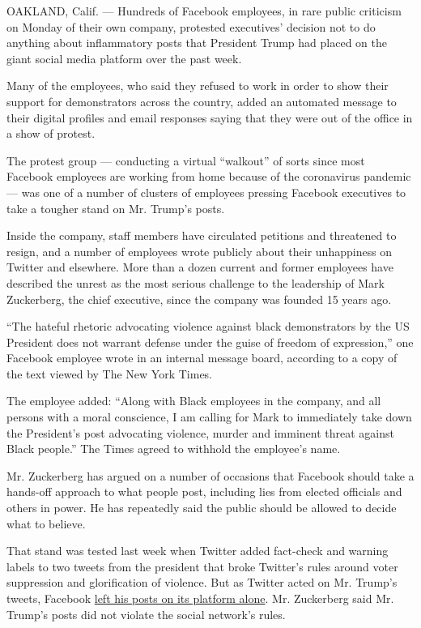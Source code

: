 OAKLAND, Calif. --- Hundreds of Facebook employees, in rare public
criticism on Monday of their own company, protested executives' decision
not to do anything about inflammatory posts that President Trump had
placed on the giant social media platform over the past week.

Many of the employees, who said they refused to work in order to show
their support for demonstrators across the country, added an automated
message to their digital profiles and email responses saying that they
were out of the office in a show of protest.

The protest group --- conducting a virtual ``walkout'' of sorts since
most Facebook employees are working from home because of the coronavirus
pandemic --- was one of a number of clusters of employees pressing
Facebook executives to take a tougher stand on Mr. Trump's posts.

Inside the company, staff members have circulated petitions and
threatened to resign, and a number of employees wrote publicly about
their unhappiness on Twitter and elsewhere. More than a dozen current
and former employees have described the unrest as the most serious
challenge to the leadership of Mark Zuckerberg, the chief executive,
since the company was founded 15 years ago.

``The hateful rhetoric advocating violence against black demonstrators
by the US President does not warrant defense under the guise of freedom
of expression,'' one Facebook employee wrote in an internal message
board, according to a copy of the text viewed by The New York Times.

The employee added: ``Along with Black employees in the company, and all
persons with a moral conscience, I am calling for Mark to immediately
take down the President's post advocating violence, murder and imminent
threat against Black people.'' The Times agreed to withhold the
employee's name.

Mr. Zuckerberg has argued on a number of occasions that Facebook should
take a hands-off approach to what people post, including lies from
elected officials and others in power. He has repeatedly said the public
should be allowed to decide what to believe.

That stand was tested last week when Twitter added fact-check and
warning labels to two tweets from the president that broke Twitter's
rules around voter suppression and glorification of violence. But as
Twitter acted on Mr. Trump's tweets, Facebook
\href{https://www.nytimes3xbfgragh.onion/2020/05/29/technology/twitter-facebook-zuckerberg-trump.html}{left
his posts on its platform alone}. Mr. Zuckerberg said Mr. Trump's posts
did not violate the social network's rules.

